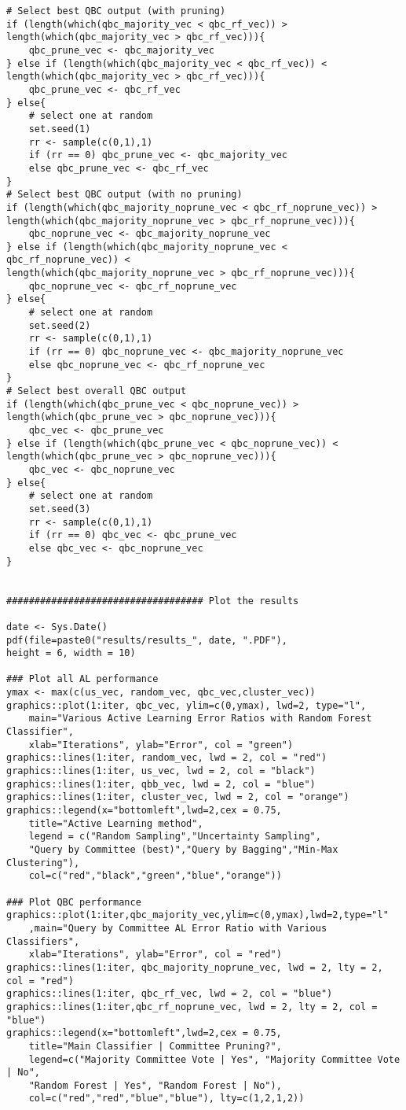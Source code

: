 {\begin{lstlisting}
# Select best QBC output (with pruning)
if (length(which(qbc_majority_vec < qbc_rf_vec)) > 
length(which(qbc_majority_vec > qbc_rf_vec))){
	qbc_prune_vec <- qbc_majority_vec
} else if (length(which(qbc_majority_vec < qbc_rf_vec)) < 
length(which(qbc_majority_vec > qbc_rf_vec))){
	qbc_prune_vec <- qbc_rf_vec
} else{
	# select one at random
	set.seed(1)
	rr <- sample(c(0,1),1)
	if (rr == 0) qbc_prune_vec <- qbc_majority_vec
	else qbc_prune_vec <- qbc_rf_vec
}
# Select best QBC output (with no pruning)
if (length(which(qbc_majority_noprune_vec < qbc_rf_noprune_vec)) > 
length(which(qbc_majority_noprune_vec > qbc_rf_noprune_vec))){
	qbc_noprune_vec <- qbc_majority_noprune_vec
} else if (length(which(qbc_majority_noprune_vec < qbc_rf_noprune_vec)) < 
length(which(qbc_majority_noprune_vec > qbc_rf_noprune_vec))){
	qbc_noprune_vec <- qbc_rf_noprune_vec
} else{
	# select one at random
	set.seed(2)
	rr <- sample(c(0,1),1)
	if (rr == 0) qbc_noprune_vec <- qbc_majority_noprune_vec
	else qbc_noprune_vec <- qbc_rf_noprune_vec
}
# Select best overall QBC output
if (length(which(qbc_prune_vec < qbc_noprune_vec)) > 
length(which(qbc_prune_vec > qbc_noprune_vec))){
	qbc_vec <- qbc_prune_vec
} else if (length(which(qbc_prune_vec < qbc_noprune_vec)) < 
length(which(qbc_prune_vec > qbc_noprune_vec))){
	qbc_vec <- qbc_noprune_vec
} else{
	# select one at random
	set.seed(3)
	rr <- sample(c(0,1),1)
	if (rr == 0) qbc_vec <- qbc_prune_vec
	else qbc_vec <- qbc_noprune_vec
}


################################### Plot the results

date <- Sys.Date()
pdf(file=paste0("results/results_", date, ".PDF"), 
height = 6, width = 10)

### Plot all AL performance
ymax <- max(c(us_vec, random_vec, qbc_vec,cluster_vec))
graphics::plot(1:iter, qbc_vec, ylim=c(0,ymax), lwd=2, type="l", 
	main="Various Active Learning Error Ratios with Random Forest Classifier", 
	xlab="Iterations", ylab="Error", col = "green")
graphics::lines(1:iter, random_vec, lwd = 2, col = "red")
graphics::lines(1:iter, us_vec, lwd = 2, col = "black")
graphics::lines(1:iter, qbb_vec, lwd = 2, col = "blue")
graphics::lines(1:iter, cluster_vec, lwd = 2, col = "orange")
graphics::legend(x="bottomleft",lwd=2,cex = 0.75,
	title="Active Learning method",
	legend = c("Random Sampling","Uncertainty Sampling",
	"Query by Committee (best)","Query by Bagging","Min-Max Clustering"),
	col=c("red","black","green","blue","orange"))

### Plot QBC performance
graphics::plot(1:iter,qbc_majority_vec,ylim=c(0,ymax),lwd=2,type="l"
	,main="Query by Committee AL Error Ratio with Various Classifiers", 
	xlab="Iterations", ylab="Error", col = "red")
graphics::lines(1:iter, qbc_majority_noprune_vec, lwd = 2, lty = 2, col = "red")
graphics::lines(1:iter, qbc_rf_vec, lwd = 2, col = "blue")
graphics::lines(1:iter,qbc_rf_noprune_vec, lwd = 2, lty = 2, col = "blue")
graphics::legend(x="bottomleft",lwd=2,cex = 0.75,
	title="Main Classifier | Committee Pruning?",
	legend=c("Majority Committee Vote | Yes", "Majority Committee Vote | No",
	"Random Forest | Yes", "Random Forest | No"),
	col=c("red","red","blue","blue"), lty=c(1,2,1,2))


\end{lstlisting}}
